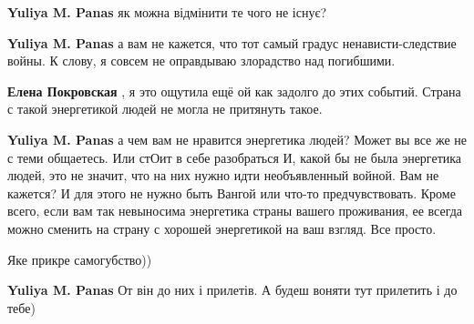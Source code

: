 \begin{itemize}
\begin{itemize}
\begin{itemize}
\textbf{Yuliya M. Panas} як можна відмінити те чого не існує?

 
\textbf{Yuliya M. Panas} а вам не кажется, что тот самый градус
ненависти-следствие войны. К слову, я совсем не оправдываю злорадство над
погибшими.

 
\textbf{Елена Покровская} , я это ощутила ещё ой как задолго до этих событий. Страна с такой энергетикой людей не могла не притянуть такое.

 
\textbf{Yuliya M. Panas} а чем вам не нравится энергетика людей? Может вы все же
не с теми общаетесь. Или стОит в себе разобраться И, какой бы не была энергетика
людей, это не значит, что на них нужно идти необъявленный войной. Вам не кажется? И
для этого не нужно быть Вангой или что-то предчувствовать. Кроме всего, если вам
так невыносима энергетика страны вашего проживания, ее всегда можно сменить на
страну с хорошей энергетикой на ваш взгляд. Все просто.

 
Яке прикре самогубство))

 
\textbf{Yuliya M. Panas} От він до них і прилетів. А будеш воняти тут прилетить і до тебе)


\end{itemize}
\end{itemize}
\end{itemize}
